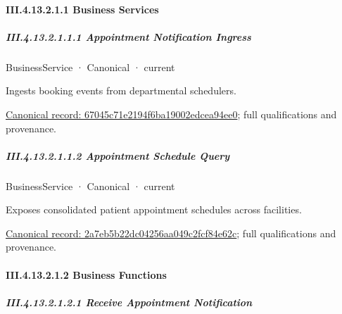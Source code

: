 \paragraph*{III.4.13.2.1.1 Business Services}
\label{navigation:III.4.13.2.1.1}

\subparagraph*{III.4.13.2.1.1.1 Appointment Notification Ingress}
\label{navigation:III.4.13.2.1.1.1}

\label{element:67045c71e2194f6ba19002edcea94ee0}
{\small BusinessService · Canonical · current}\par

Ingests booking events from departmental schedulers.


{\footnotesize \href{../../../../../../../continuum/business/business-service/67045c71e2194f6ba19002edcea94ee0.md}{Canonical record: 67045c71e2194f6ba19002edcea94ee0}; full qualifications and provenance.}\par
\subparagraph*{III.4.13.2.1.1.2 Appointment Schedule Query}
\label{navigation:III.4.13.2.1.1.2}

\label{element:2a7eb5b22dc04256aa049c2fcf84e62c}
{\small BusinessService · Canonical · current}\par

Exposes consolidated patient appointment schedules across facilities.


{\footnotesize \href{../../../../../../../continuum/business/business-service/2a7eb5b22dc04256aa049c2fcf84e62c.md}{Canonical record: 2a7eb5b22dc04256aa049c2fcf84e62c}; full qualifications and provenance.}\par
\paragraph*{III.4.13.2.1.2 Business Functions}
\label{navigation:III.4.13.2.1.2}

\subparagraph*{III.4.13.2.1.2.1 Receive Appointment Notification}
\label{navigation:III.4.13.2.1.2.1}

